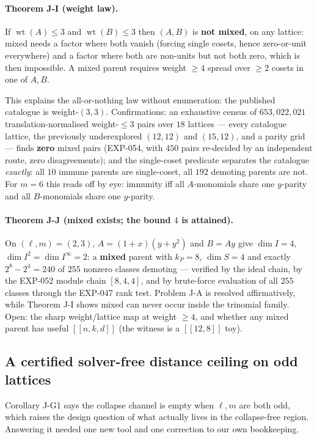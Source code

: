 \documentclass[11pt]{article}
\theoremstyle{plain}
\theoremstyle{remark}
\begin{document}
\paragraph{Theorem J-I (weight law).} If $\operatorname{wt}(A)\le3$ and
$\operatorname{wt}(B)\le3$ then $(A,B)$ is \textbf{not mixed}, on any lattice:
mixed needs a factor where both vanish (forcing single cosets, hence
zero-or-unit everywhere) and a factor where both are non-units but not both
zero, which is then impossible. A mixed parent requires weight $\ge4$ spread
over $\ge2$ cosets in one of $A,B$.

This explains the all-or-nothing law without enumeration: the published
catalogue is weight-$(3,3)$. Confirmations: an exhaustive census of
$653{,}022{,}021$ translation-normalised weight-$\le3$ pairs over $18$ lattices
--- every catalogue lattice, the previously underexplored $(12,12)$ and
$(15,12)$, and a parity grid --- finds \textbf{zero} mixed pairs (EXP-054, with
$450$ pairs re-decided by an independent route, zero disagreements); and the
single-coset predicate separates the catalogue \emph{exactly}: all $10$ immune
parents are single-coset, all $192$ demoting parents are not. For $m=6$ this
reads off by eye: immunity iff all $A$-monomials share one $y$-parity and all
$B$-monomials share one $y$-parity.

\paragraph{Theorem J-J (mixed exists; the bound $4$ is attained).} On
$(\ell,m)=(2,3)$, $A=(1+x)(y+y^2)$ and $B=Ay$ give $\dim I=4$,
$\dim I^2=\dim I^\infty=2$: a \textbf{mixed} parent with $k_P=8$, $\dim S=4$ and
exactly $2^8-2^4=240$ of $255$ nonzero classes demoting --- verified by the
ideal chain, by the EXP-052 module chain $[8,4,4]$, and by brute-force
evaluation of all $255$ classes through the EXP-047 rank test. Problem J-A is
resolved affirmatively, while Theorem J-I shows mixed can never occur inside the
trinomial family. Open: the sharp weight/lattice map at weight $\ge4$, and
whether any mixed parent has useful $[[n,k,d]]$ (the witness is a $[[12,8]]$
toy).

\subsection{A certified solver-free distance ceiling on odd
lattices}\label{sec:ceiling}

Corollary J-G1 says the collapse channel is empty when $\ell,m$ are both odd,
which raises the design question of what actually lives in the collapse-free
region. Answering it needed one new tool and one correction to our own
bookkeeping.
\end{document}
